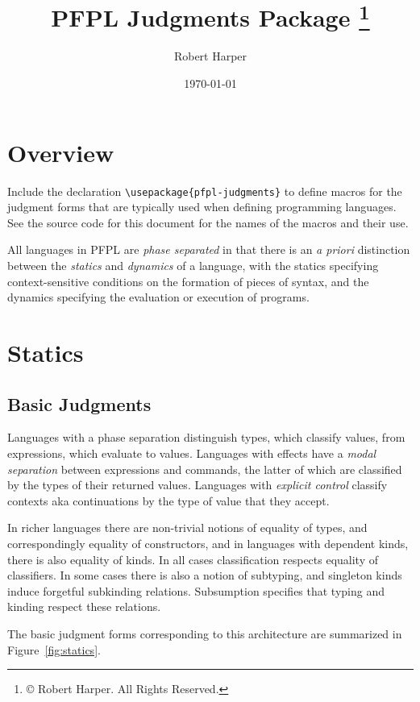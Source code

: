 \documentclass[11pt]{article}
\title{\textsf{PFPL} Judgments Package%
\footnote{\copyright{} \the\year{} Robert Harper.  All Rights Reserved.}}
\author{Robert Harper}
\date{\today}
\begin{document}
\maketitle{}

\section*{Overview}

Include the declaration \verb|\usepackage{pfpl-judgments}| to define macros for the judgment forms that are typically used when defining programming languages.  See the source code for this document for the names of the macros and their use.

All languages in \textsf{PFPL} are \emph{phase separated} in that there is an \emph{a priori} distinction between the \emph{statics} and \emph{dynamics} of a language, with the statics specifying context-sensitive conditions on the formation of pieces of syntax, and the dynamics specifying the evaluation or execution of programs.

\section*{Statics}


\subsection*{Basic Judgments}

Languages with a phase separation distinguish types, which classify values, from expressions, which evaluate to values.  Languages with effects have a \emph{modal separation} between expressions and commands, the latter of which are classified by the types of their returned values.  Languages with \emph{explicit control} classify contexts aka continuations by the type of value that they accept.

In richer languages there are non-trivial notions of equality of types, and correspondingly equality of constructors, and in languages with dependent kinds, there is also equality of kinds.  In all cases classification respects equality of classifiers.  In some cases there is also a notion of subtyping, and singleton kinds induce forgetful subkinding relations.  Subsumption specifies that typing and kinding respect these relations.

The basic judgment forms corresponding to this architecture are summarized in Figure~\ref{fig:statics}.
\end{document}
